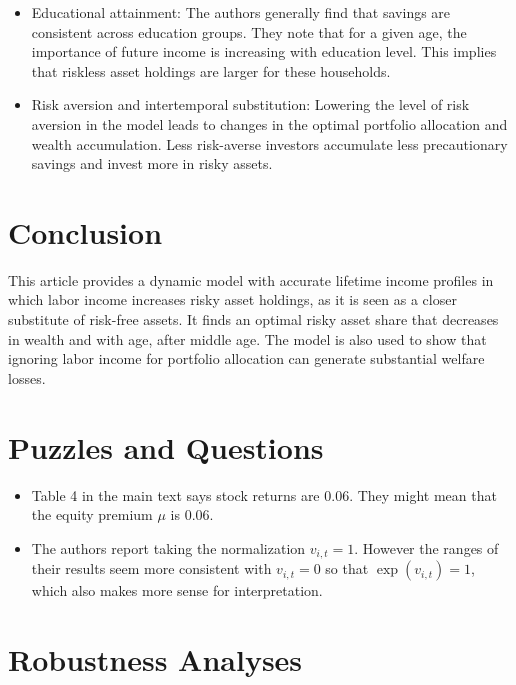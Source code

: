 \documentclass[./CGMPortfolio.tex]{subfiles}
\begin{document}
\begin{itemize}
	\item Educational attainment: The authors generally find that savings are consistent across education groups. They note that for a given age, the importance of future income is increasing with education level. This implies that riskless asset holdings are larger for these households.
	\item Risk aversion and intertemporal substitution: Lowering the level of risk aversion in the model leads to changes in the optimal portfolio allocation and wealth accumulation. Less risk-averse investors accumulate less precautionary savings and invest more in risky assets.
\end{itemize}

\hypertarget{Conclusion}{}
\section{Conclusion}

This article provides a dynamic model with accurate lifetime income profiles in which labor income increases risky asset holdings, as it is seen as a closer substitute of risk-free assets. It finds an optimal risky asset share that decreases in wealth and with age, after middle age. The model is also used to show that ignoring labor income for portfolio allocation can generate substantial welfare losses.

\hypertarget{Puzzles-and-Questions}{}
\section{Puzzles and Questions}\label{sec:Puzzles}
\begin{itemize}
	\item Table 4 in the main text says stock returns are $0.06$. They might 
	mean that the equity premium $\mu$ is $0.06$.
	\item The authors report taking the normalization $v_{i,t} = 1$. However the ranges of their results seem more consistent with $v_{i,t} = 0$ so that $\exp (v_{i,t}) = 1$, which also makes more sense for interpretation.
\end{itemize}

\hypertarget{Robustness Analyses}{}
\section{Robustness Analyses}
\end{document}
